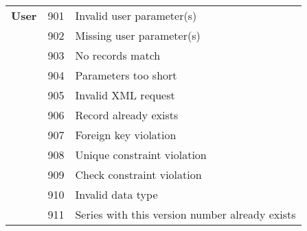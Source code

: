 \begin{longtable}{lll}
  \textbf{User} 
  & 901 & Invalid user parameter(s) \\
  & 902 & Missing user parameter(s) \\
  & 903 & No records match \\
  & 904 & Parameters too short \\
  & 905 & Invalid XML request \\
  & 906 & Record already exists \\
  & 907 & Foreign key violation \\
  & 908 & Unique constraint violation \\
  & 909 & Check constraint violation \\
  & 910 & Invalid data type \\
  & 911 & Series with this version number already exists \\


  \bottomrule
\end{longtable}
